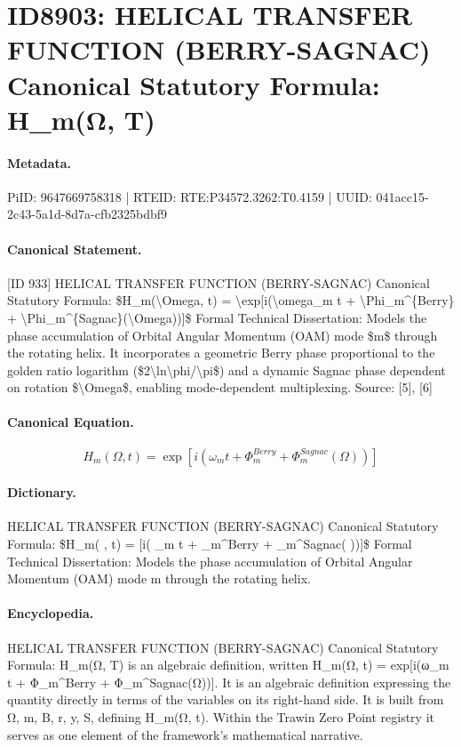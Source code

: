 \section*{ID8903: HELICAL TRANSFER FUNCTION (BERRY-SAGNAC) Canonical Statutory Formula: H\_m(Ω, T)}
\paragraph{Metadata.}
PiID: 9647669758318 | RTEID: RTE:P34572.3262:T0.4159 | UUID: 041acc15-2c43-5a1d-8d7a-cfb2325bdbf9

\paragraph{Canonical Statement.}
[ID 933] HELICAL TRANSFER FUNCTION (BERRY-SAGNAC) Canonical Statutory Formula: \$H\_m(\textbackslash{}Omega, t) = \textbackslash{}exp[i(\textbackslash{}omega\_m t + \textbackslash{}Phi\_m\textasciicircum{}\{Berry\} + \textbackslash{}Phi\_m\textasciicircum{}\{Sagnac\}(\textbackslash{}Omega))]\$ Formal Technical Dissertation: Models the phase accumulation of Orbital Angular Momentum (OAM) mode \$m\$ through the rotating helix. It incorporates a geometric Berry phase proportional to the golden ratio logarithm (\$2\textbackslash{}ln\textbackslash{}phi/\textbackslash{}pi\$) and a dynamic Sagnac phase dependent on rotation \$\textbackslash{}Omega\$, enabling mode-dependent multiplexing. Source: [5], [6]

\paragraph{Canonical Equation.}
\[
H_m(\Omega, t) = \exp[i(\omega_m t + \Phi_m^{Berry} + \Phi_m^{Sagnac}(\Omega))]
\]

\paragraph{Dictionary.}
HELICAL TRANSFER FUNCTION (BERRY-SAGNAC) Canonical Statutory Formula: \$H\_m( , t) = [i( \_m t + \_m\textasciicircum{}Berry + \_m\textasciicircum{}Sagnac( ))]\$ Formal Technical Dissertation: Models the phase accumulation of Orbital Angular Momentum (OAM) mode m through the rotating helix.

\paragraph{Encyclopedia.}
HELICAL TRANSFER FUNCTION (BERRY-SAGNAC) Canonical Statutory Formula: H\_m(Ω, T) is an algebraic definition, written H\_m(Ω, t) = exp[i(ω\_m t + Φ\_m\textasciicircum{}Berry + Φ\_m\textasciicircum{}Sagnac(Ω))]. It is an algebraic definition expressing the quantity directly in terms of the variables on its right-hand side. It is built from Ω, m, B, r, y, S, defining H\_m(Ω, t). Within the Trawin Zero Point registry it serves as one element of the framework's mathematical narrative.
